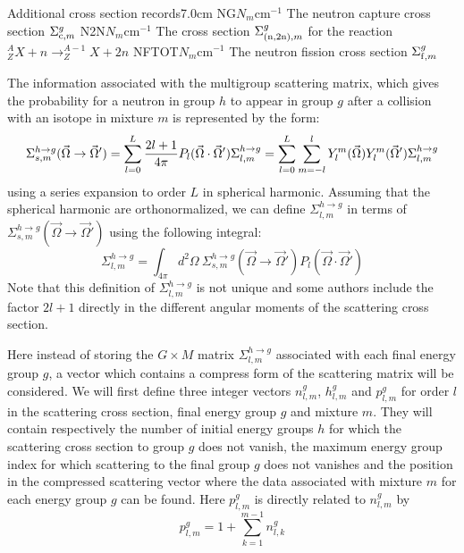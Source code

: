 \begin{DescriptionEnregistrement}{Additional cross section records}{7.0cm}
\RealEnr
  {NG}{$N_{m}$}{cm$^{-1}$}
  {The neutron capture cross section $\Sigma_{{\rm c},m}^{g}$}
\RealEnr
  {N2N}{$N_{m}$}{cm$^{-1}$}
  {The cross section
   $\Sigma_{{\rm (n,2n)},m}^{g}$ for the reaction 
   $^{A}_{Z}X+n \to ^{A-1}_{Z}X+2n$}
\RealEnr
  {NFTOT}{$N_{m}$}{cm$^{-1}$}
  {The neutron fission cross section $\Sigma_{{\rm f},m}^{g}$}
\end{DescriptionEnregistrement}

The information associated with the multigroup scattering matrix, which gives the probability for a
neutron in group $h$ to appear in group $g$ after a collision with an isotope in mixture $m$
is represented by the form:
  \begin{displaymath}
    \Sigma_{s,m}^{h\to g}(\vec{\Omega}\to\vec{\Omega}')
      =\sum_{l=0}^{L}{{2l+1}\over{4\pi}} P_{l}(\vec{\Omega}\cdot\vec{\Omega}')
    \Sigma_{l,m}^{h\to g}
      =\sum_{l=0}^{L}\sum_{m=-l}^{l}
    Y_{l}^{m}(\vec{\Omega})Y_{l}^{m}(\vec{\Omega}')\Sigma_{l,m}^{h\to g}
  \end{displaymath}
using a series expansion to order $L$ in spherical harmonic. Assuming that the 
spherical harmonic are orthonormalized, 
we can define $\Sigma_{l,m}^{h\to g}$ in terms of $\Sigma_{s,m}^{h\to
g}(\vec{\Omega}\to\vec{\Omega}')$ using the following integral:
  \begin{displaymath}
    \Sigma_{l,m}^{h\to g}
      =\int_{4\pi}d^{2}\Omega \ \Sigma_{s,m}^{h\to g}(\vec{\Omega}\to\vec{\Omega}')
     P_{l}(\vec{\Omega}\cdot\vec{\Omega}')
  \end{displaymath}
Note that this definition of $\Sigma_{l,m}^{h\to g}$ is not unique and some authors
include the factor $2l+1$ directly in the different angular moments of the 
scattering cross section.

\vskip 0.2cm

Here instead of storing the $G\times M$
matrix $\Sigma_{l,m}^{h\to g}$ associated with each final energy group $g$, a vector which
contains a compress form of the scattering  matrix will be considered. 
We will first define three integer vectors $n_{l,m}^{g}$,
$h_{l,m}^{g}$ and $p_{l,m}^{g}$ for order $l$ in the scattering cross section,
final energy group $g$ and mixture $m$. They will contain respectively the number of
initial energy groups $h$ for which the scattering cross section to group $g$ does not vanish, the
maximum energy group index for which scattering to the final group $g$ does not vanishes and the
position in the compressed scattering vector where the data associated with mixture $m$ for each
energy group $g$ can be found. Here $p_{l,m}^{g}$ is directly related to $n_{l,m}^{g}$ by
  \begin{displaymath}
    p_{l,m}^{g}=1+\sum_{k=1}^{m-1} n_{l,k}^{g}
  \end{displaymath}

